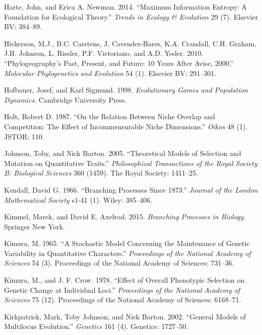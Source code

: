 \documentclass[]{article}
\begin{document}
\leavevmode\hypertarget{ref-Harte2014}{}%
Harte, John, and Erica A. Newman. 2014. ``Maximum Information Entropy: A
Foundation for Ecological Theory.'' \emph{Trends in Ecology \&
Evolution} 29 (7). Elsevier BV: 384--89.

\leavevmode\hypertarget{ref-Hickerson2010}{}%
Hickerson, M.J., B.C. Carstens, J. Cavender-Bares, K.A. Crandall, C.H.
Graham, J.B. Johnson, L. Rissler, P.F. Victoriano, and A.D. Yoder. 2010.
``Phylogeography's Past, Present, and Future: 10 Years After Avise,
2000.'' \emph{Molecular Phylogenetics and Evolution} 54 (1). Elsevier
BV: 291--301.

\leavevmode\hypertarget{ref-Hofbauer1998}{}%
Hofbauer, Josef, and Karl Sigmund. 1998. \emph{Evolutionary Games and
Population Dynamics}. Cambridge University Press.

\leavevmode\hypertarget{ref-Holt1987}{}%
Holt, Robert D. 1987. ``On the Relation Between Niche Overlap and
Competition: The Effect of Incommensurable Niche Dimensions.''
\emph{Oikos} 48 (1). JSTOR: 110.

\leavevmode\hypertarget{ref-Johnson2005}{}%
Johnson, Toby, and Nick Barton. 2005. ``Theoretical Models of Selection
and Mutation on Quantitative Traits.'' \emph{Philosophical Transactions
of the Royal Society B: Biological Sciences} 360 (1459). The Royal
Society: 1411--25.

\leavevmode\hypertarget{ref-Kendall1966}{}%
Kendall, David G. 1966. ``Branching Processes Since 1873.''
\emph{Journal of the London Mathematical Society} s1-41 (1). Wiley:
385--406.

\leavevmode\hypertarget{ref-Kimmel2015}{}%
Kimmel, Marek, and David E. Axelrod. 2015. \emph{Branching Processes in
Biology}. Springer New York.

\leavevmode\hypertarget{ref-Kimura1965}{}%
Kimura, M. 1965. ``A Stochastic Model Concerning the Maintenance of
Genetic Variability in Quantitative Characters.'' \emph{Proceedings of
the National Academy of Sciences} 54 (3). Proceedings of the National
Academy of Sciences: 731--36.

\leavevmode\hypertarget{ref-Kimura1978}{}%
Kimura, M., and J. F. Crow. 1978. ``Effect of Overall Phenotypic
Selection on Genetic Change at Individual Loci.'' \emph{Proceedings of
the National Academy of Sciences} 75 (12). Proceedings of the National
Academy of Sciences: 6168--71.

\leavevmode\hypertarget{ref-Kirkpatrick1727}{}%
Kirkpatrick, Mark, Toby Johnson, and Nick Barton. 2002. ``General Models
of Multilocus Evolution.'' \emph{Genetics} 161 (4). Genetics: 1727--50.
\end{document}
